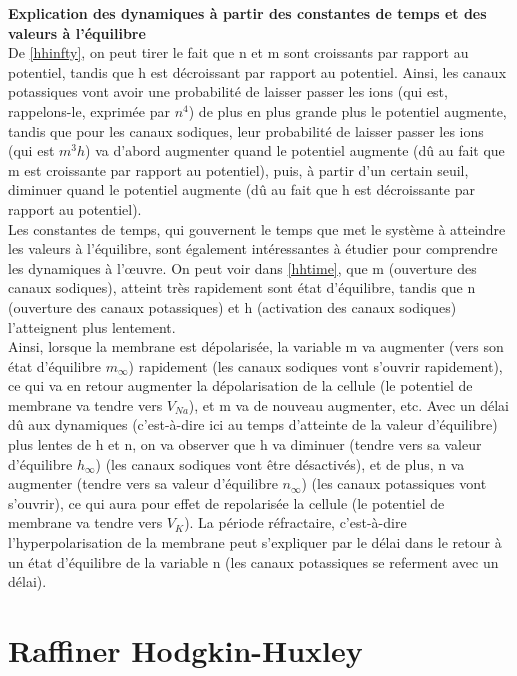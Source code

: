 \documentclass[12pt]{scrartcl}
\begin{document}
\clearpage
\textbf{Explication des dynamiques à partir des constantes de temps et des valeurs à l'équilibre}\\
De \ref{hhinfty}, on peut tirer le fait que n et m sont croissants par rapport au potentiel, tandis que h est décroissant par rapport au potentiel. Ainsi, les canaux potassiques vont avoir une probabilité de laisser passer les ions (qui est, rappelons-le, exprimée par $n^4$) de plus en plus grande plus le potentiel augmente, tandis que pour les canaux sodiques, leur probabilité de laisser passer les ions (qui est $m^3h$) va d'abord augmenter quand le potentiel augmente (dû au fait que m est croissante par rapport au potentiel), puis, à partir d'un certain seuil, diminuer quand le potentiel augmente (dû au fait que h est décroissante par rapport au potentiel).\\
Les constantes de temps, qui gouvernent le temps que met le système à atteindre les valeurs à l'équilibre, sont également intéressantes à étudier pour comprendre les dynamiques à l'œuvre. On peut voir dans \ref{hhtime}, que m (ouverture des canaux sodiques), atteint très rapidement sont état d'équilibre, tandis que n (ouverture des canaux potassiques) et h (activation des canaux sodiques) l'atteignent plus lentement.\\
Ainsi, lorsque la membrane est dépolarisée, la variable m va augmenter (vers son état d'équilibre $m_\infty$) rapidement (les canaux sodiques vont s'ouvrir rapidement), ce qui va en retour augmenter la dépolarisation de la cellule (le potentiel de membrane va tendre vers $V_{Na}$), et m va de nouveau augmenter, etc. Avec un délai dû aux dynamiques (c'est-à-dire ici au temps d'atteinte de la valeur d'équilibre) plus lentes de h et n, on va observer que h va diminuer (tendre vers sa valeur d’équilibre $h_\infty$) (les canaux sodiques vont être désactivés), et de plus, n va augmenter (tendre vers sa valeur d'équilibre $n_\infty$) (les canaux potassiques vont s'ouvrir), ce qui aura pour effet de repolarisée la cellule (le potentiel de membrane va tendre vers $V_{K}$). La période réfractaire, c'est-à-dire l'hyperpolarisation de la membrane peut s'expliquer par le délai dans le retour à un état d'équilibre de la variable n (les canaux potassiques se referment avec un délai).


\section{Raffiner Hodgkin-Huxley}
\end{document}
